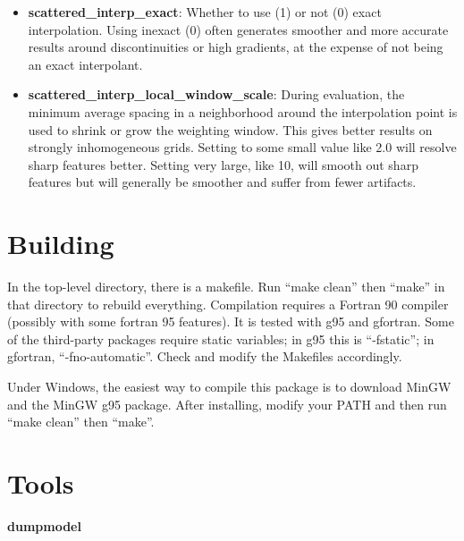 \documentclass[10pt]{article}
\begin{document}
\begin{itemize}
\begin{itemize}
    \item{\bf scattered\_interp\_exact}:
      Whether to use (1) or not (0) exact interpolation.  Using
      inexact (0) often generates smoother and more accurate results
      around discontinuities or high gradients, at the expense of not 
      being an exact interpolant.
    \item{\bf scattered\_interp\_local\_window\_scale}:
      During evaluation, the minimum average spacing in a neighborhood
      around the interpolation point is used to shrink or grow the
      weighting window.  This gives better results on strongly
      inhomogeneous grids.  Setting to some small value like 2.0 will
      resolve sharp features better.  Setting very large, like 10,
      will smooth out sharp features but will generally be smoother
      and suffer from fewer artifacts.
    \end{itemize}
\end{itemize}

\section{Building}

In the top-level directory, there is a makefile.  Run ``make clean''
then ``make'' in that directory to rebuild everything.  Compilation
requires a Fortran 90 compiler (possibly with some fortran 95
features).  It is tested with g95 and gfortran.  Some of the
third-party packages require static variables; in g95 this is
``-fstatic''; in gfortran, ``-fno-automatic''.  Check and modify the
Makefiles accordingly.

Under Windows, the easiest way to compile this package is to download
MinGW and the MinGW g95 package.  After installing, modify your PATH
and then run ``make clean'' then ``make''.

\section{Tools}

{\bf dumpmodel}
\end{document}
